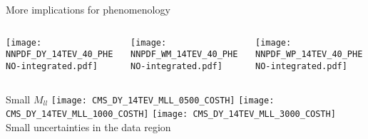 \begin{frame}{More implications for phenomenology}
    \begin{columns}
        \begin{column}[T]{0.32\textwidth}
            \centering
            \texttt{[image: NNPDF\_DY\_14TEV\_40\_PHENO-integrated.pdf]}
        \end{column}
        \begin{column}[T]{0.32\textwidth}
            \centering
            \texttt{[image: NNPDF\_WM\_14TEV\_40\_PHENO-integrated.pdf]}\\
        \end{column}
        \begin{column}[T]{0.32\textwidth}
            \centering
            \texttt{[image: NNPDF\_WP\_14TEV\_40\_PHENO-integrated.pdf]}
        \end{column}
    \end{columns}
\end{frame}


\begin{frame}{Small $M_{ll}$}
    \centering
    \texttt{[image: CMS\_DY\_14TEV\_MLL\_0500\_COSTH]}
    \texttt{[image: CMS\_DY\_14TEV\_MLL\_1000\_COSTH]}
    \texttt{[image: CMS\_DY\_14TEV\_MLL\_3000\_COSTH]}\\
    Small uncertainties in the data region
\end{frame}


